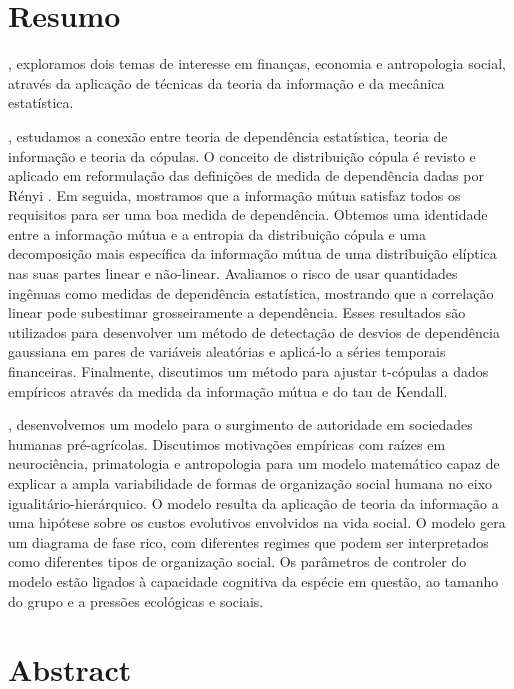 \chapter*{Resumo}

, exploramos dois temas de interesse em finanças, economia e antropologia social, através da aplicação de técnicas da teoria da informação e da mecânica estatística.

, estudamos a conexão entre teoria de dependência estatística, teoria de informação e teoria da cópulas. O conceito de distribuição cópula é revisto e aplicado em reformulação das definições de medida de dependência dadas por Rényi \cite{Renyi1959}. Em seguida, mostramos que a informação mútua satisfaz todos os requisitos para ser uma boa medida de dependência. Obtemos uma identidade entre a informação mútua e a entropia da distribuição cópula e uma decomposição mais específica da informação mútua de uma distribuição elíptica nas suas partes linear e não-linear. Avaliamos o risco de usar quantidades ingênuas como medidas de dependência estatística, mostrando que a correlação linear pode subestimar grosseiramente a dependência. Esses resultados são utilizados para desenvolver um método de detectação de desvios de dependência gaussiana em pares de variáveis ​​aleatórias e aplicá-lo a séries temporais financeiras. Finalmente, discutimos um método para ajustar t-cópulas a dados empíricos \cite{Calsaverini2009} através da medida da informação mútua e do tau de Kendall.

, desenvolvemos um modelo para o surgimento de autoridade em sociedades humanas pré-agrícolas. Discutimos motivações empíricas com raízes em neurociência, primatologia e antropologia para um modelo matemático capaz de explicar a ampla variabilidade de formas de organização social humana no eixo igualitário-hierárquico. O modelo resulta da aplicação de teoria da informação a uma hipótese sobre os custos evolutivos envolvidos na vida social. O modelo gera um diagrama de fase rico, com diferentes regimes que podem ser interpretados como diferentes tipos de organização social. Os parâmetros de controler do modelo estão ligados à capacidade cognitiva da espécie em questão, ao tamanho do grupo e a pressões ecológicas e sociais.

\chapter*{Abstract}
 
